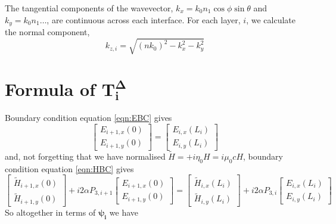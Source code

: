 \documentclass[notitlepage,nofootinbib]{revtex4-1}
\renewcommand{\vec}[1]{\mathbf{#1}}
\begin{document}
The tangential components of the wavevector, $ k_x = k_0 n_1 \cos\phi \sin\theta $ and $ k_y = k_0 n_1 \dots $, are continuous across each interface. For each layer, $ i $, we calculate the normal component,
\begin{equation}
	k_{z,i} = \sqrt{(nk_0)^2 - k_x^2 -k_y^2}
\end{equation}

\appendix

\section{\label{app:TiDelta}Formula of $ \vec{T_i^\Delta} $}

Boundary condition equation \eqref{eqn:EBC} gives
\begin{equation}
	\begin{bmatrix}
		E_{i+1,x}(0) \\
		E_{i+1,y}(0)
	\end{bmatrix}
	=
	\begin{bmatrix}
		E_{i,x}(L_i) \\
		E_{i,y}(L_i)
	\end{bmatrix}
\end{equation}
and, not forgetting that we have normalised $\tilde{H} = +i \eta_0 H = i \mu_0 c H $, boundary condition equation \eqref{eqn:HBC} gives
\begin{equation}
	\begin{bmatrix}
		\tilde{H}_{i+1,x}(0) \\
		\tilde{H}_{i+1,y}(0)
	\end{bmatrix}
	+
	i2\alpha P_{3,i+1}\begin{bmatrix}
		E_{i+1,x}(0) \\
		E_{i+1,y}(0)
	\end{bmatrix}
	=
	\begin{bmatrix}
		\tilde{H}_{i,x}(L_i) \\
		\tilde{H}_{i,y}(L_i)
	\end{bmatrix}
	+
	i2\alpha P_{3,i}\begin{bmatrix}
		E_{i,x}(L_i) \\
		E_{i,y}(L_i)
	\end{bmatrix}
\end{equation}
So altogether in terms of $ \boldsymbol{\psi_i} $ we have
\end{document}
